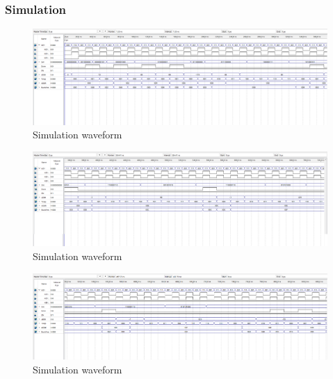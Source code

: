 \subsubsection{Simulation}
\begin{figure}[h]
    \centering
    \includegraphics[scale = 0.3]{source/picture/Lab10/pic4.png}
    \caption{Simulation waveform}
\end{figure}
\begin{figure}[h]
    \centering
    \includegraphics[scale = 0.3]{source/picture/Lab10/pic5.png}
    \caption{Simulation waveform}
\end{figure}
\begin{figure}[h]
    \centering
    \includegraphics[scale = 0.3]{source/picture/Lab10/pic6.png}
    \caption{Simulation waveform}
\end{figure}
\newpage
